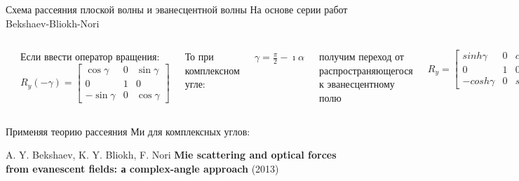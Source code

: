 \documentclass[9pt, compress, xcolor=table]{beamer}
\begin{document}
\begin{frame}{Схема рассеяния плоской волны и эванесцентной волны}
    На основе серии работ Bekshaev-Bliokh-Nori
    
\begin{columns}[c]

\column{8cm}

\begin{center}
\includegraphics[width=0.9\textwidth]{bliokh0}
\end{center}

\column{4.5cm}
Если ввести оператор вращения: 
\begin{equation*}
    R_y(-\gamma)=\begin{bmatrix}
    \cos\gamma & 0 & \sin \gamma\\
    0 & 1 & 0 \\
    -\sin\gamma & 0 & \cos \gamma
    \end{bmatrix}
\end{equation*}

То при комплексном угле:

$\gamma=\frac{\pi}{2}-\imath \alpha$

получим переход от распространяющегося к эванесцентному полю

\begin{equation*}
    R_y=\begin{bmatrix}
    sinh\gamma & 0 & cosh \gamma\\
    0 & 1 & 0 \\
    -cosh\gamma & 0 & sinh \gamma
    \end{bmatrix}
\end{equation*}

\end{columns}    
    
Применяя теорию рассеяния Ми для комплексных углов:    

\small{A. Y. Bekshaev, K. Y. Bliokh, F. Nori \textbf{Mie scattering and optical forces from evanescent fields: а complex-angle approach} (2013)}
\end{frame}
\end{document}
